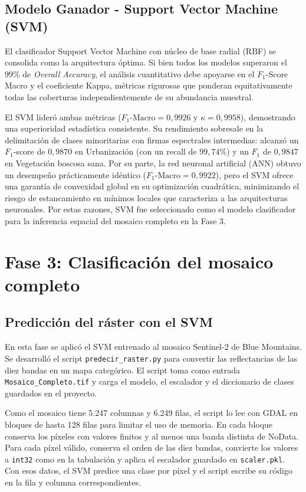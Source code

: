 \documentclass[12pt]{article}
\begin{document}
\subsection{Modelo Ganador - Support Vector Machine (SVM)}
El clasificador Support Vector Machine con núcleo de base radial (RBF) se consolida como la arquitectura óptima. Si bien todos los modelos superaron el 99\% de \textit{Overall Accuracy}, el análisis cuantitativo debe apoyarse en el $F_1$-Score Macro y el coeficiente Kappa, métricas rigurosas que ponderan equitativamente todas las coberturas independientemente de su abundancia muestral.

El SVM lideró ambas métricas ($F_1\text{-Macro} = 0{,}9926$ y $\kappa = 0{,}9958$), demostrando una superioridad estadística consistente. Su rendimiento sobresale en la delimitación de clases minoritarias con firmas espectrales intermedias: alcanzó un $F_1$-score de $0{,}9870$ en Urbanización (con un recall de $99{,}74\%$) y un $F_1$ de $0{,}9847$ en Vegetación boscosa sana. Por su parte, la red neuronal artificial (ANN) obtuvo un desempeño prácticamente idéntico ($F_1\text{-Macro} = 0{,}9922$), pero el SVM ofrece una garantía de convexidad global en su optimización cuadrática, minimizando el riesgo de estancamiento en mínimos locales que caracteriza a las arquitecturas neuronales. Por estas razones, SVM fue seleccionado como el modelo clasificador para la inferencia espacial del mosaico completo en la Fase 3.
\clearpage

\section{Fase 3: Clasificación del mosaico completo}
\label{sec:fase3}

\subsection{Predicción del ráster con el SVM}

En esta fase se aplicó el SVM entrenado al mosaico Sentinel-2 de Blue Mountains. Se desarrolló el script \texttt{predecir\_raster.py} para convertir las reflectancias de las diez bandas en un mapa categórico. El script toma como entrada \texttt{Mosaico\_Completo.tif} y carga el modelo, el escalador y el diccionario de clases guardados en el proyecto.

Como el mosaico tiene 5.247 columnas y 6.249 filas, el script lo lee con GDAL en bloques de hasta 128 filas para limitar el uso de memoria. En cada bloque conserva los píxeles con valores finitos y al menos una banda distinta de NoData. Para cada píxel válido, conserva el orden de las diez bandas, convierte los valores a \texttt{int32} como en la tabulación y aplica el escalador guardado en \texttt{scaler.pkl}. Con esos datos, el SVM predice una clase por píxel y el script escribe su código en la fila y columna correspondientes.
\end{document}
